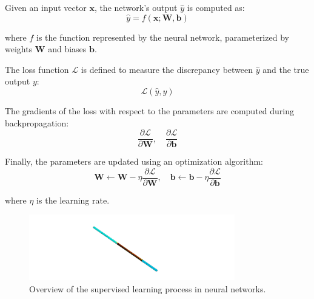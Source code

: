     \vspace{1em} \noindent Given an input vector \( \mathbf{x} \), the network's output \( \hat{y} \) is computed as:
    \begin{equation}
    \hat{y} = f(\mathbf{x}; \mathbf{W}, \mathbf{b})
    \end{equation}

    \noindent where \( f \) is the function represented by the neural network, parameterized by weights \( \mathbf{W} \) and biases \( \mathbf{b} \).

    \vspace{1em} \noindent The loss function \( \mathcal{L} \) is defined to measure the discrepancy between \( \hat{y} \) and the true output \( y \):
    \begin{equation}
    \mathcal{L}(\hat{y}, y)
    \end{equation}

    \vspace{1em} \noindent The gradients of the loss with respect to the parameters are computed during backpropagation:
    \begin{equation}
    \frac{\partial \mathcal{L}}{\partial \mathbf{W}}, \quad \frac{\partial \mathcal{L}}{\partial \mathbf{b}}
    \end{equation}

    \noindent Finally, the parameters are updated using an optimization algorithm:
    \begin{equation}
    \mathbf{W} \leftarrow \mathbf{W} - \eta \frac{\partial \mathcal{L}}{\partial \mathbf{W}}, \quad \mathbf{b} \leftarrow \mathbf{b} - \eta \frac{\partial \mathcal{L}}{\partial \mathbf{b}}
    \end{equation}

    \noindent where \( \eta \) is the learning rate.

    \begin{figure}[h]
    \centering
    \includegraphics[width=0.8\textwidth]{00_Images/00_Velocity.png}
    \caption{Overview of the supervised learning process in neural networks.}
    \label{fig:supervised_learning}
    \end{figure}

